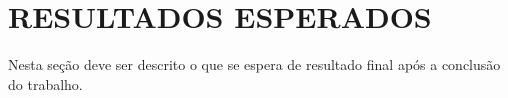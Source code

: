\chapter{RESULTADOS ESPERADOS}

Nesta seção deve ser descrito o que se espera de resultado final após a conclusão do trabalho.